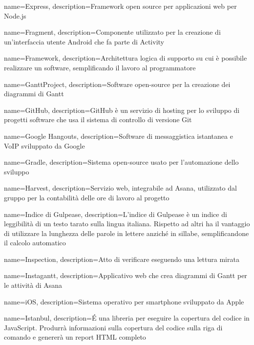 {
	name={Express},
	description={Framework open source per applicazioni web per Node.js}
	{\pagebreak}
}

{
	name={Fragment},
	description={Componente utilizzato per la creazione di un'interfaccia utente Android che fa parte di Activity}
}

{
	name={Framework},
	description={Architettura logica di supporto su cui è possibile realizzare un software, semplificando il lavoro al programmatore}
	{\pagebreak}
}

{
	name={GanttProject},
	description={Software open-source per la creazione dei diagrammi di Gantt}
}

{
	name={GitHub},
	description={GitHub è un servizio di hosting per lo sviluppo di progetti software che usa il sistema di controllo di versione Git}
}

{
	name={Google Hangouts},
	description={Software di messaggistica istantanea e VoIP sviluppato da Google}
}

{
	name={Gradle},
	description={Sistema open-source usato per l'automazione dello sviluppo}
	{\pagebreak}
}

{
	name={Harvest},
	description={Servizio web, integrabile ad Asana, utilizzato dal gruppo per la contabilità delle ore di lavoro al progetto}
	{\pagebreak}
}

{
	name={Indice di Gulpease},
	description={L’indice di Gulpease è un indice di leggibilità di un testo tarato sulla lingua
		italiana. Rispetto ad altri ha il vantaggio di utilizzare la lunghezza delle parole in lettere anziché in sillabe, semplificandone il calcolo automatico}
}

{
	name={Inspection},
	description={Atto di verificare eseguendo una lettura mirata}
}

{
	name={Instagantt},
	description={Applicativo web che crea diagrammi di Gantt per le attività di Asana}
}

{
	name={iOS},
	description={Sistema operativo per smartphone sviluppato da Apple}
}

{
	name={Istanbul},
	description={É una libreria per eseguire la copertura del codice in JavaScript. Produrrà informazioni sulla copertura del codice sulla riga di comando e genererà un report HTML completo}
	{\pagebreak}
}

